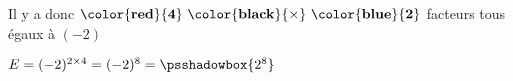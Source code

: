 \begin{exemple*1}
\begin{multicols}{2}
\begin{enumerate}
            \medskip
            Il y a donc $\mathbf{\color{red}{4}~\color{black}{\times}~\color{blue}{2}}$ facteurs tous égaux à $(-2)$

            \medskip
            $E=(-2)^{2\times4} = (-2)^{8}= \psshadowbox{ 2^{8}}$
        \end{enumerate}
    \end{multicols}
\end{exemple*1}